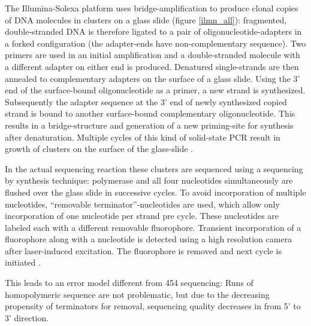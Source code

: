 
The Illumina-Solexa platform uses bridge-amplification to produce
clonal copies of DNA molecules in clusters on a glass slide (figure
\ref{ilmn_all}): fragmented, double-stranded DNA is therefore ligated to
a pair of oligonucleotide-adapters in a forked configuration (the
adapter-ends have non-complementary sequence). Two primers are used in
an initial amplification and a double-stranded molecule with a
different adapter on either end is produced. Denatured single-strands
are then annealed to complementary adapters on the surface of a glass
slide. Using the 3' end of the surface-bound oligonucleotide as a
primer, a new strand is synthesized. Subsequently the adapter sequence
at the 3' end of newly synthesized copied strand is bound to another
surface-bound complementary oligonucleotide. This results in a
bridge-structure and generation of a new priming-site for synthesis
after denaturation. Multiple cycles of this kind of solid-state PCR
result in growth of clusters on the surface of the glass-slide
\cite{pmid18987734}.

In the actual sequencing reaction these clusters are sequenced using a
sequencing by synthesis technique: polymerase and all four nucleotides
simultaneously are flushed over the glass slide in successive
cycles. To avoid incorporation of multiple nucleotides, ``removable
terminator''-nucleotides are used, which allow only incorporation of
one nucleotide per strand pre cycle. These nucleotides are labeled
each with a different removable fluorophore. Transient incorporation
of a fluorophore along with a nucleotide is detected using a high
resolution camera after laser-induced excitation. The fluorophore is
removed and next cycle is initiated \cite{pmid18987734}.

This leads to an error model different from 454 sequencing: Runs of
homopolymeric sequence are not problematic, but due to the decreasing
propensity of terminators for removal, sequencing quality decreases in
from 5' to 3' direction.

